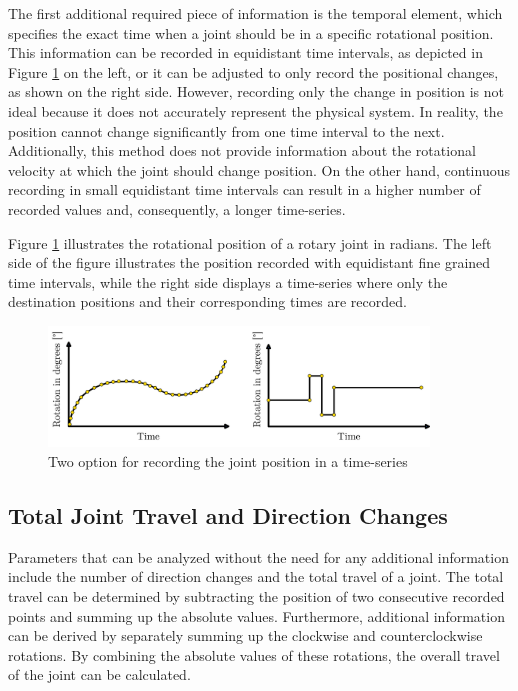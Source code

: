 The first additional required piece of information is the temporal element, which specifies the exact time when a joint should be in a specific rotational position. This information can be recorded in equidistant time intervals, as depicted in Figure \ref{equi} on the left, or it can be adjusted to only record the positional changes, as shown on the right side. However, recording only the change in position is not ideal because it does not accurately represent the physical system. In reality, the position cannot change significantly from one time interval to the next. Additionally, this method does not provide information about the rotational velocity at which the joint should change position. On the other hand, continuous recording in small equidistant time intervals can result in a higher number of recorded values and, consequently, a longer time-series.

Figure \ref{equi} illustrates the rotational position of a rotary joint in radians. The left side of the figure illustrates the position recorded with equidistant fine grained time intervals, while the right side displays a time-series where only the destination positions and their corresponding times are recorded.


\begin{figure}[H]
	\centerline{\includegraphics[width=0.9\textwidth]{figures/equionchange.png}}
	\caption{Two option for recording the joint position in a time-series}
	\label{equi}
\end{figure}


\subsection{Total Joint Travel and Direction Changes}
Parameters that can be analyzed without the need for any additional information include the number of direction changes and the total travel of a joint. The total travel can be determined by subtracting the position of two consecutive recorded points and summing up the absolute values. Furthermore, additional information can be derived by separately summing up the clockwise and counterclockwise rotations. By combining the absolute values of these rotations, the overall travel of the joint can be calculated.

